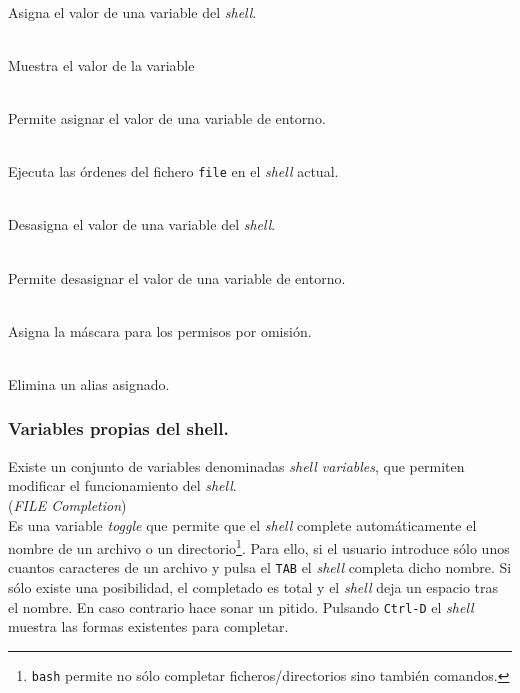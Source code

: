 \vspace{0.2cm}
\noindent
{}\\[1mm]
Asigna el valor de una variable del {\it shell}.

\vspace{0.2cm}
\noindent
{}\\
Muestra el valor de la variable

\vspace{0.2cm}
\noindent
{}\\[1mm]
Permite asignar el valor de una variable de entorno.

\vspace{0.2cm}
\noindent
{}\\[1mm]
Ejecuta las {\'o}rdenes del fichero \verb+file+ en el {\it shell} actual.

\vspace{0.2cm}
\noindent
{}\\[1mm]
Desasigna el valor de una variable del {\it shell}.

\vspace{0.2cm}
\noindent
{}\\[1mm]
Permite desasignar el valor de una variable de entorno.

\vspace{0.2cm}
\noindent
{}\\[1mm]
Asigna la m{\'a}scara para los permisos por omisi{\'o}n.

\vspace{0.2cm}
\noindent
{}\\[1mm]
Elimina un alias asignado.


\subsubsection{Variables propias del shell.}

Existe un conjunto de variables denominadas {\it shell variables}, que
permiten modificar el funcionamiento del {\it shell}.\\
 ({\it FILE Completion})\\[1mm]
Es una variable {\it toggle} que permite que el {\it shell}
complete autom{\'a}ticamente el nombre de un archivo o un
directorio\footnote{{\tt bash} permite no s{\'o}lo completar
  ficheros/directorios sino tambi{\'e}n comandos.}. Para ello, si el
usuario introduce s{\'o}lo unos cuantos caracteres de un archivo y pulsa
el \verb+TAB+ el {\it shell} completa dicho nombre. Si s{\'o}lo existe una
posibilidad, el completado es total y el {\it shell} deja un espacio
tras el nombre. En caso contrario hace sonar un pitido. Pulsando
\verb+Ctrl-D+ el {\it shell} muestra las formas existentes para
completar.

